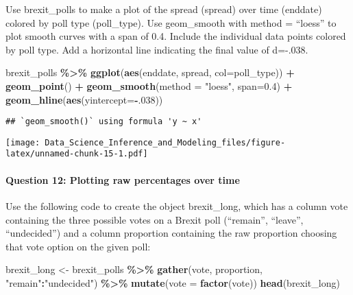 \documentclass[
]{article}
\newenvironment{Shaded}{\begin{snugshade}}{\end{snugshade}}
\newcommand{\DataTypeTok}[1]{\textcolor[rgb]{0.13,0.29,0.53}{#1}}
\newcommand{\DecValTok}[1]{\textcolor[rgb]{0.00,0.00,0.81}{#1}}
\newcommand{\FloatTok}[1]{\textcolor[rgb]{0.00,0.00,0.81}{#1}}
\newcommand{\KeywordTok}[1]{\textcolor[rgb]{0.13,0.29,0.53}{\textbf{#1}}}
\newcommand{\NormalTok}[1]{#1}
\newcommand{\OperatorTok}[1]{\textcolor[rgb]{0.81,0.36,0.00}{\textbf{#1}}}
\newcommand{\StringTok}[1]{\textcolor[rgb]{0.31,0.60,0.02}{#1}}
\begin{document}
Use brexit\_polls to make a plot of the spread (spread) over time
(enddate) colored by poll type (poll\_type). Use geom\_smooth with
method = ``loess'' to plot smooth curves with a span of 0.4. Include the
individual data points colored by poll type. Add a horizontal line
indicating the final value of d=-.038.

\begin{Shaded}
\begin{Highlighting}[]
\NormalTok{brexit\_polls }\OperatorTok{\%\textgreater{}\%}
\StringTok{  }\KeywordTok{ggplot}\NormalTok{(}\KeywordTok{aes}\NormalTok{(enddate, spread, }\DataTypeTok{col=}\NormalTok{poll\_type)) }\OperatorTok{+}
\StringTok{  }\KeywordTok{geom\_point}\NormalTok{() }\OperatorTok{+}
\StringTok{  }\KeywordTok{geom\_smooth}\NormalTok{(}\DataTypeTok{method =} \StringTok{"loess"}\NormalTok{, }\DataTypeTok{span=}\FloatTok{0.4}\NormalTok{) }\OperatorTok{+}
\StringTok{  }\KeywordTok{geom\_hline}\NormalTok{(}\KeywordTok{aes}\NormalTok{(}\DataTypeTok{yintercept=}\OperatorTok{{-}}\NormalTok{.}\DecValTok{038}\NormalTok{))}
\end{Highlighting}
\end{Shaded}

\begin{verbatim}
## `geom_smooth()` using formula 'y ~ x'
\end{verbatim}

\texttt{[image: Data\_Science\_Inference\_and\_Modeling\_files/figure-latex/unnamed-chunk-15-1.pdf]}

\hypertarget{question-12-plotting-raw-percentages-over-time}{%
\paragraph{Question 12: Plotting raw percentages over
time}\label{question-12-plotting-raw-percentages-over-time}}

Use the following code to create the object brexit\_long, which has a
column vote containing the three possible votes on a Brexit poll
(``remain'', ``leave'', ``undecided'') and a column proportion
containing the raw proportion choosing that vote option on the given
poll:

\begin{Shaded}
\begin{Highlighting}[]
\NormalTok{brexit\_long \textless{}{-}}\StringTok{ }\NormalTok{brexit\_polls }\OperatorTok{\%\textgreater{}\%}
\StringTok{    }\KeywordTok{gather}\NormalTok{(vote, proportion, }\StringTok{"remain"}\OperatorTok{:}\StringTok{"undecided"}\NormalTok{) }\OperatorTok{\%\textgreater{}\%}
\StringTok{    }\KeywordTok{mutate}\NormalTok{(}\DataTypeTok{vote =} \KeywordTok{factor}\NormalTok{(vote))}
\KeywordTok{head}\NormalTok{(brexit\_long)}
\end{Highlighting}
\end{Shaded}
\end{document}
